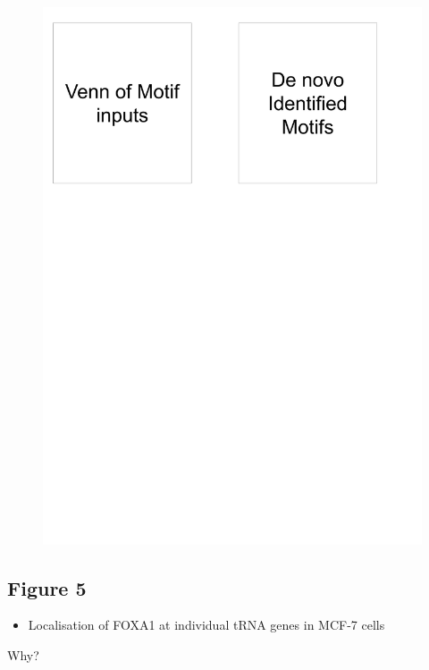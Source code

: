 \documentclass[
  11pt,
]{article}
\providecommand{\tightlist}{%
  \setlength{\itemsep}{0pt}\setlength{\parskip}{0pt}}
\begin{document}
\begin{figure}[p]

{\centering \includegraphics[width=1\linewidth]{../images/results-04} 

}

\end{figure}

\hypertarget{figure-5}{%
\subsection{Figure 5}\label{figure-5}}

\begin{itemize}
\tightlist
\item
  Localisation of FOXA1 at individual tRNA genes in MCF-7 cells
\end{itemize}

Why?
\end{document}
